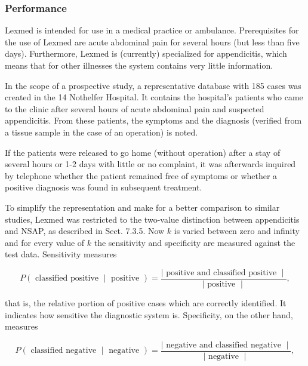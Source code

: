 \documentclass[10pt]{book}
\begin{document}
\subsubsection*{Performance}
Lexmed is intended for use in a medical practice or ambulance. Prerequisites for the use of Lexmed are acute abdominal pain for several hours (but less than five days). Furthermore, Lexmed is (currently) specialized for appendicitis, which means that for other illnesses the system contains very little information.

In the scope of a prospective study, a representative database with 185 cases was created in the 14 Nothelfer Hospital. It contains the hospital's patients who came to the clinic after several hours of acute abdominal pain and suspected appendicitis. From these patients, the symptoms and the diagnosis (verified from a tissue sample in the case of an operation) is noted.

If the patients were released to go home (without operation) after a stay of several hours or 1-2 days with little or no complaint, it was afterwards inquired by telephone whether the patient remained free of symptoms or whether a positive diagnosis was found in subsequent treatment.

To simplify the representation and make for a better comparison to similar studies, Lexmed was restricted to the two-value distinction between appendicitis and NSAP, as described in Sect. 7.3.5. Now $k$ is varied between zero and infinity\\
and for every value of $k$ the sensitivity and specificity are measured against the test data. Sensitivity measures


\begin{equation*}
P(\text { classified positive } \mid \text { positive })=\frac{\mid \text { positive and classified positive } \mid}{\mid \text { positive } \mid}, \tag{7.16}
\end{equation*}


that is, the relative portion of positive cases which are correctly identified. It indicates how sensitive the diagnostic system is. Specificity, on the other hand, measures


\begin{equation*}
P(\text { classified negative } \mid \text { negative })=\frac{\mid \text { negative and classified negative } \mid}{\mid \text { negative } \mid}, \tag{7.17}
\end{equation*}
\end{document}
